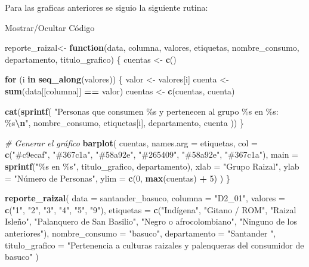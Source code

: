 \documentclass[
]{article}
\newenvironment{Shaded}{\begin{snugshade}}{\end{snugshade}}
\newcommand{\AttributeTok}[1]{\textcolor[rgb]{0.13,0.29,0.53}{#1}}
\newcommand{\CommentTok}[1]{\textcolor[rgb]{0.56,0.35,0.01}{\textit{#1}}}
\newcommand{\ControlFlowTok}[1]{\textcolor[rgb]{0.13,0.29,0.53}{\textbf{#1}}}
\newcommand{\DecValTok}[1]{\textcolor[rgb]{0.00,0.00,0.81}{#1}}
\newcommand{\FunctionTok}[1]{\textcolor[rgb]{0.13,0.29,0.53}{\textbf{#1}}}
\newcommand{\NormalTok}[1]{#1}
\newcommand{\OtherTok}[1]{\textcolor[rgb]{0.56,0.35,0.01}{#1}}
\newcommand{\SpecialCharTok}[1]{\textcolor[rgb]{0.81,0.36,0.00}{\textbf{#1}}}
\newcommand{\StringTok}[1]{\textcolor[rgb]{0.31,0.60,0.02}{#1}}
\begin{document}
Para las graficas anteriores se siguio la siguiente rutina:

Mostrar/Ocultar Código

\begin{Shaded}
\begin{Highlighting}[]
\NormalTok{reporte\_raizal}\OtherTok{\textless{}{-}} \ControlFlowTok{function}\NormalTok{(data, columna, valores, etiquetas, nombre\_consumo, departamento, titulo\_grafico) \{}
\NormalTok{  cuentas }\OtherTok{\textless{}{-}} \FunctionTok{c}\NormalTok{()}
  
  \ControlFlowTok{for}\NormalTok{ (i }\ControlFlowTok{in} \FunctionTok{seq\_along}\NormalTok{(valores)) \{}
\NormalTok{    valor }\OtherTok{\textless{}{-}}\NormalTok{ valores[i]}
\NormalTok{    cuenta }\OtherTok{\textless{}{-}} \FunctionTok{sum}\NormalTok{(data[[columna]] }\SpecialCharTok{==}\NormalTok{ valor)}
\NormalTok{    cuentas }\OtherTok{\textless{}{-}} \FunctionTok{c}\NormalTok{(cuentas, cuenta)}
    
    \FunctionTok{cat}\NormalTok{(}\FunctionTok{sprintf}\NormalTok{(}
      \StringTok{"Personas que consumen \%s y pertenecen al grupo \%s en \%s: \%s}\SpecialCharTok{\textbackslash{}n}\StringTok{"}\NormalTok{, }
\NormalTok{      nombre\_consumo, etiquetas[i], departamento, cuenta}
\NormalTok{    ))}
\NormalTok{  \}}
  
  \CommentTok{\# Generar el gráfico}
  \FunctionTok{barplot}\NormalTok{(}
\NormalTok{    cuentas,}
    \AttributeTok{names.arg =}\NormalTok{ etiquetas,}
    \AttributeTok{col =} \FunctionTok{c}\NormalTok{(}\StringTok{"\#c9ecaf"}\NormalTok{, }\StringTok{"\#367c1a"}\NormalTok{, }\StringTok{"\#58a92e"}\NormalTok{, }\StringTok{"\#265409"}\NormalTok{, }\StringTok{"\#58a92e"}\NormalTok{, }\StringTok{"\#367c1a"}\NormalTok{),}
    \AttributeTok{main =} \FunctionTok{sprintf}\NormalTok{(}\StringTok{"\%s en \%s"}\NormalTok{, titulo\_grafico, departamento),}
    \AttributeTok{xlab =} \StringTok{"Grupo Raizal"}\NormalTok{,}
    \AttributeTok{ylab =} \StringTok{"Número de Personas"}\NormalTok{,}
    \AttributeTok{ylim =} \FunctionTok{c}\NormalTok{(}\DecValTok{0}\NormalTok{, }\FunctionTok{max}\NormalTok{(cuentas) }\SpecialCharTok{+} \DecValTok{5}\NormalTok{)}
\NormalTok{  )}
\NormalTok{\}}

\FunctionTok{reporte\_raizal}\NormalTok{(}
  \AttributeTok{data =}\NormalTok{ santander\_basuco,}
  \AttributeTok{columna =} \StringTok{"D2\_01"}\NormalTok{,}
  \AttributeTok{valores =} \FunctionTok{c}\NormalTok{(}\StringTok{"1"}\NormalTok{, }\StringTok{"2"}\NormalTok{, }\StringTok{"3"}\NormalTok{, }\StringTok{"4"}\NormalTok{, }\StringTok{"5"}\NormalTok{, }\StringTok{"9"}\NormalTok{),}
  \AttributeTok{etiquetas =} \FunctionTok{c}\NormalTok{(}\StringTok{"Indígena"}\NormalTok{, }\StringTok{"Gitano / ROM"}\NormalTok{, }\StringTok{"Raizal Isleño"}\NormalTok{, }\StringTok{"Palanquero de San Basilio"}\NormalTok{, }\StringTok{"Negro o afrocolombiano"}\NormalTok{, }\StringTok{"Ninguno de los anteriores"}\NormalTok{),}
  \AttributeTok{nombre\_consumo =} \StringTok{"basuco"}\NormalTok{,}
  \AttributeTok{departamento =} \StringTok{"Santander "}\NormalTok{,}
  \AttributeTok{titulo\_grafico =} \StringTok{"Pertenencia a culturas raizales y palenqueras del consumidor de basuco"}
\NormalTok{)}


\end{Highlighting}
\end{Shaded}
\end{document}
